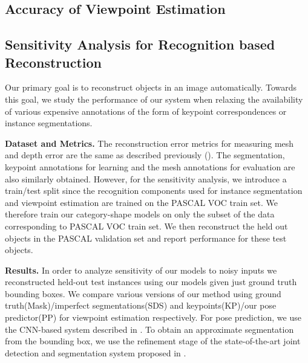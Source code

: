 \subsection{Accuracy of Viewpoint Estimation}

%

\subsection{Sensitivity Analysis for Recognition based Reconstruction} 



Our primary goal is to reconstruct objects in an image automatically. Towards this goal, we study the performance of our system when relaxing the availability of various  expensive annotations of the form of keypoint correspondences or instance segmentations. 

\vspace{3mm}
\noindent \textbf{Dataset and Metrics.}
The reconstruction error metrics for measuring mesh and depth error are the same as described previously (). The segmentation, keypoint annotations for learning and the mesh annotations for evaluation are also similarly obtained. However, for the sensitivity analysis, we introduce a train/test split since the recognition components used for instance segmentation and viewpoint estimation are trained on the PASCAL VOC train set. We therefore train our category-shape models  on only the subset of the data corresponding to PASCAL VOC train set. We then reconstruct the held out objects in the PASCAL validation set and report performance for these test objects.

\vspace{3mm}
\noindent \textbf{Results.}
In order to analyze sensitivity of our models to noisy inputs we reconstructed held-out test instances using our models given just ground truth bounding boxes. We compare various versions of our method using ground truth(Mask)/imperfect segmentations(SDS) and keypoints(KP)/our pose predictor(PP) for viewpoint estimation respectively. For pose prediction, we use the CNN-based system described in . To obtain an approximate segmentation from the bounding box, we use the refinement stage of the state-of-the-art joint detection and segmentation system proposed in \cite{BharathECCV2014}. 

